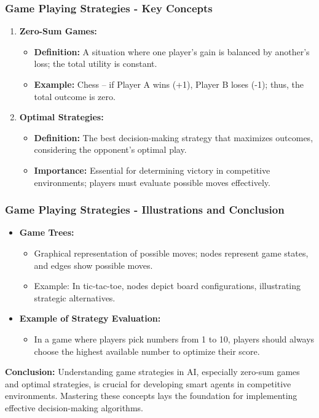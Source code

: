 \documentclass[aspectratio=169]{beamer}
\begin{document}
\begin{frame}[fragile]
    \frametitle{Game Playing Strategies - Key Concepts}
    \begin{enumerate}
        \item \textbf{Zero-Sum Games:}
        \begin{itemize}
            \item \textbf{Definition:} A situation where one player's gain is balanced by another's loss; the total utility is constant.
            \item \textbf{Example:} Chess – if Player A wins (+1), Player B loses (-1); thus, the total outcome is zero.
        \end{itemize}
        
        \item \textbf{Optimal Strategies:}
        \begin{itemize}
            \item \textbf{Definition:} The best decision-making strategy that maximizes outcomes, considering the opponent's optimal play.
            \item \textbf{Importance:} Essential for determining victory in competitive environments; players must evaluate possible moves effectively.
        \end{itemize}
    \end{enumerate}
\end{frame}

\begin{frame}[fragile]
    \frametitle{Game Playing Strategies - Illustrations and Conclusion}
    \begin{itemize}
        \item \textbf{Game Trees:}
        \begin{itemize}
            \item Graphical representation of possible moves; nodes represent game states, and edges show possible moves.
            \item Example: In tic-tac-toe, nodes depict board configurations, illustrating strategic alternatives.
        \end{itemize}

        \item \textbf{Example of Strategy Evaluation:}
        \begin{itemize}
            \item In a game where players pick numbers from 1 to 10, players should always choose the highest available number to optimize their score.
        \end{itemize}
    \end{itemize}
    
    \textbf{Conclusion:} 
    Understanding game strategies in AI, especially zero-sum games and optimal strategies, is crucial for developing smart agents in competitive environments. Mastering these concepts lays the foundation for implementing effective decision-making algorithms.
\end{frame}
\end{document}
